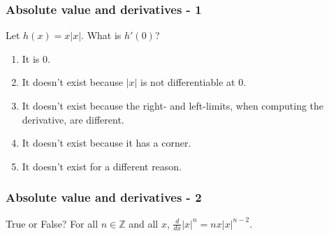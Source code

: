 \documentclass[14pt]{beamer}
\begin{document}
	\begin{frame}[t]
		\frametitle{Absolute value and derivatives - 1}

		Let $h(x) = x|x|$. What is $h'(0)$?

		\begin{enumerate}
			\item It is 0.

			\item It doesn't exist because $|x|$ is not differentiable at $0$.

			\item It doesn't exist because the right- and left-limits, when computing the
				derivative, are different.

			\item It doesn't exist because it has a corner.

			\item It doesn't exist for a different reason.
		\end{enumerate}
	\end{frame}


	\begin{frame}[t]
		\frametitle{Absolute value and derivatives - 2}

		\begin{block}{True or False?}
			For all $n \in \mathbb{Z}$ and all $x$, $\frac{d}{dx}|x|^{n}=nx|x|^{n-2}$.
		\end{block}
	\end{frame}

\end{document}
